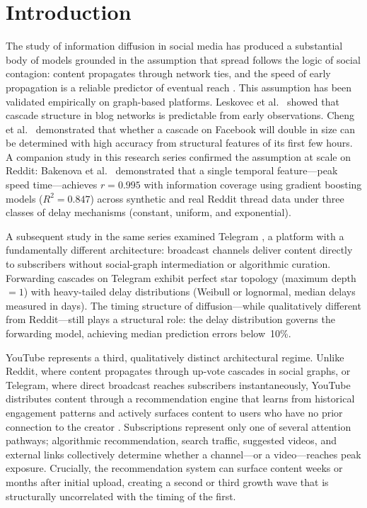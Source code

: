 \documentclass[journal,article,submit,pdftex,moreauthors]{Definitions/mdpi}
\begin{document}
\section{Introduction}
\label{sec:intro}

The study of information diffusion in social media has produced a substantial
body of models grounded in the assumption that spread follows the logic of
social contagion: content propagates through network ties, and the speed of
early propagation is a reliable predictor of eventual reach
\cite{ref-kermack1927,ref-pastor2015,ref-goel2016}.
This assumption has been validated empirically on graph-based platforms.
Leskovec et al.\ \cite{ref-leskovec2007} showed that cascade structure in
blog networks is predictable from early observations.
Cheng et al.\ \cite{ref-cheng2014} demonstrated that whether a cascade
on Facebook will double in size can be determined with high accuracy from
structural features of its first few hours.
A companion study in this research series confirmed the assumption at scale
on Reddit: Bakenova et al.\ \cite{ref-paper1} demonstrated that a single
temporal feature---peak speed time---achieves $r = 0.995$ with information
coverage using gradient boosting models ($R^2 = 0.847$) across synthetic
and real Reddit thread data under three classes of delay mechanisms
(constant, uniform, and exponential).

A subsequent study in the same series examined Telegram
\cite{ref-paper2}, a platform with a fundamentally different architecture:
broadcast channels deliver content directly to subscribers without
social-graph intermediation or algorithmic curation.
Forwarding cascades on Telegram exhibit perfect star topology (maximum
depth~$= 1$) with heavy-tailed delay distributions (Weibull or lognormal,
median delays measured in days).
The timing structure of diffusion---while qualitatively different from
Reddit---still plays a structural role: the delay distribution governs
the forwarding model, achieving median prediction errors below~10\%.

YouTube represents a third, qualitatively distinct architectural regime.
Unlike Reddit, where content propagates through up-vote cascades in social
graphs, or Telegram, where direct broadcast reaches subscribers
instantaneously, YouTube distributes content through a recommendation
engine that learns from historical engagement patterns and actively surfaces
content to users who have no prior connection to the creator
\cite{ref-covington2016}.
Subscriptions represent only one of several attention pathways; algorithmic
recommendation, search traffic, suggested videos, and external links
collectively determine whether a channel---or a video---reaches peak
exposure.
Crucially, the recommendation system can surface content weeks or months
after initial upload, creating a second or third growth wave that is
structurally uncorrelated with the timing of the first.
\end{document}
